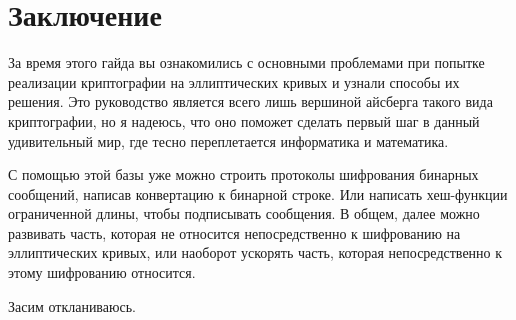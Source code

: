 
\section{Заключение}
За время этого гайда вы ознакомились с основными проблемами при попытке реализации криптографии на эллиптических кривых и узнали способы их решения. Это руководство является всего лишь вершиной айсберга такого вида криптографии, но я надеюсь, что оно поможет сделать первый шаг в данный удивительный мир, где тесно переплетается информатика и математика.

С помощью этой базы уже можно строить протоколы шифрования бинарных сообщений, написав конвертацию к бинарной строке. Или написать хеш-функции ограниченной длины, чтобы подписывать сообщения. В общем, далее можно развивать часть, которая не относится непосредственно к шифрованию на эллиптических кривых, или наоборот ускорять часть, которая непосредственно к этому шифрованию относится.

Засим откланиваюсь.

